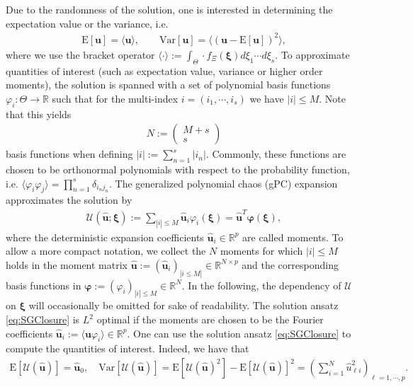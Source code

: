 Due to the randomness of the solution, one is interested in determining the expectation value or the variance, i.e.
\begin{align*}
\text{E}[\bm{u}] = \langle \bm{u} \rangle,\qquad \text{Var}[\bm{u}] = \langle \left( \bm{u}-\text{E}[\bm{u}]\right)^2\rangle,
\end{align*}
where we use the bracket operator $\langle \cdot \rangle := \int_{\Theta} \cdot f_{\Xi}(\bm\xi)d\xi_1 \cdots d\xi_s$. To approximate quantities of interest (such as expectation value, variance or higher order moments), the solution is spanned with a set of polynomial basis functions $\varphi_{i}:\Theta\to\mathbb{R}$ such that for the multi-index $i = (i_1,\cdots,i_s)$ we have $|i| \leq M$. Note that this yields
\begin{align}\label{eq:numberBasisFcts}
N:=\begin{pmatrix}
M+s \\ s
\end{pmatrix}
\end{align}
basis functions when defining $|i|:=\sum_{n = 1}^s |i_n|$. Commonly, these functions are chosen to be orthonormal polynomials \cite{wiener1938homogeneous} with respect to the probability function, i.e. $\langle \varphi_i \varphi_j \rangle =\prod_{n=1}^s\delta_{i_nj_n}$. The generalized polynomial chaos (gPC) expansion \cite{xiu2002wiener} approximates the solution by
\begin{align}\label{eq:SGClosure}
\mathcal{U}(\bm{\hat u};\bm\xi):= \sum_{|i|\leq M} \bm{\hat{u}}_i\varphi_i(\bm{\xi}) = \hat{\bm u}^T\bm{\varphi}(\bm\xi),
\end{align}
where the deterministic expansion coefficients $\bm{\hat{u}}_i\in\mathbb{R}^p$ are called moments. To allow a more compact notation, we collect the $N$ moments for which $\vert i \vert \leq M$ holds in the moment matrix $\hat{\bm u}:=(\bm{\hat{u}}_i)_{|i\leq M|}\in\mathbb{R}^{N\times p}$ and the corresponding basis functions in $\bm{\varphi}:=(\varphi_i)_{|i|\leq M}\in\mathbb{R}^{N}$. In the following, the dependency of $\mathcal{U}$ on $\bm \xi$ will occasionally be omitted for sake of readability. The solution ansatz \eqref{eq:SGClosure} is $L^2$ optimal if the moments are chosen to be the Fourier coefficients $\bm{\hat u}_i := \langle \bm{u}\varphi_i \rangle\in\mathbb{R}^p$. One can use the solution ansatz \eqref{eq:SGClosure} to compute the quantities of interest. Indeed, we have that
\begin{align*}
\text{E}[\mathcal{U}(\bm{\hat u})] = \bm{\hat u}_0,\quad \text{Var}[\mathcal{U}(\bm{\hat u})] = \text{E}[\mathcal{U}(\bm{\hat u})^2] - \text{E}[\mathcal{U}(\bm{\hat u})]^2 = \left(\sum_{i = 1}^N \hat{u}_{\ell i}^2\right)_{\ell = 1,\cdots,p}.
\end{align*}

